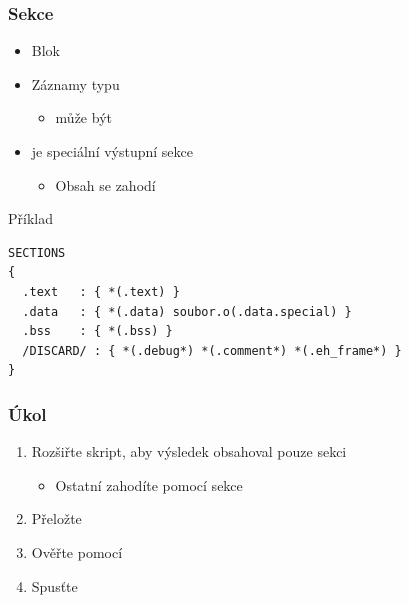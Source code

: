 \begin{frame}[fragile]
  \frametitle{Sekce}

  \begin{itemize}
    \item Blok 
    \item Záznamy typu 
    \begin{itemize}
      \item {} může být \code{*}
    \end{itemize}

    \pause

    \item {} je speciální výstupní sekce
    \begin{itemize}
      \item Obsah se zahodí
    \end{itemize}
  \end{itemize}

  \medskip
  \pause

  \begin{block}{Příklad}
  \begin{lstlisting}
SECTIONS
{
  .text   : { *(.text) }
  .data   : { *(.data) soubor.o(.data.special) }
  .bss    : { *(.bss) }
  /DISCARD/ : { *(.debug*) *(.comment*) *(.eh_frame*) }
}
  \end{lstlisting}
  \end{block}

\end{frame}

\begin{frame}
  \frametitle{Úkol}

  \begin{enumerate}
    \item Rozšiřte skript, aby výsledek obsahoval pouze sekci 
    \begin{itemize}
      \item Ostatní zahodíte pomocí  sekce
    \end{itemize}

    \item Přeložte
    \item Ověřte pomocí 
    \item Spusťte
  \end{enumerate}

\end{frame}

